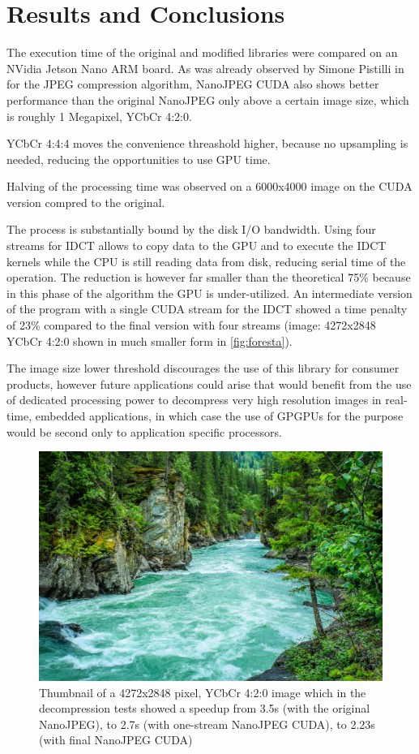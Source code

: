 \chapter{Results and Conclusions} \label{results}

The execution time of the original and modified libraries were compared on an NVidia Jetson Nano ARM board. As was already observed by Simone Pistilli in \cite{simonepap} for the JPEG compression algorithm, NanoJPEG CUDA also shows better performance than the original NanoJPEG only above a certain image size, which is roughly 1 Megapixel, YCbCr 4:2:0.

YCbCr 4:4:4 moves the convenience threashold higher, because no upsampling is needed, reducing the opportunities to use GPU time.

Halving of the processing time was observed on a 6000x4000 image on the CUDA version compred to the original.

The process is substantially bound by the disk I/O bandwidth. Using four streams for IDCT allows to copy data to the GPU and to execute the IDCT kernels while the CPU is still reading data from disk, reducing serial time of the operation. The reduction is however far smaller than the theoretical 75\% because in this phase of the algorithm the GPU is under-utilized. An intermediate version of the program with a single CUDA stream for the IDCT showed a time penalty of 23\% compared to the final version with four streams (image: 4272x2848 YCbCr 4:2:0 shown in much smaller form in \autoref{fig:foresta}).

The image size lower threshold discourages the use of this library for consumer products, however future applications could arise that would benefit from the use of dedicated processing power to decompress very high resolution images in real-time, embedded applications, in which case the use of GPGPUs for the purpose would be second only to application specific processors.

\begin{figure}
    \centering
    \includegraphics[width=1\textwidth]{Pictures/ph1_small.jpg}
    \caption{Thumbnail of a 4272x2848 pixel, YCbCr 4:2:0 image which in the decompression tests showed a speedup from 3.5s (with the original NanoJPEG), to 2.7s (with one-stream NanoJPEG CUDA), to 2.23s (with final NanoJPEG CUDA)}
    \label{fig:foresta}
\end{figure}

